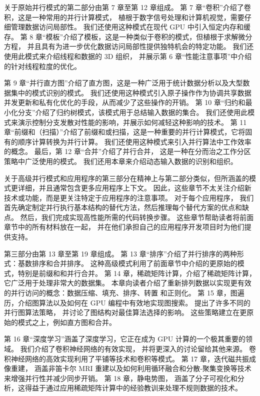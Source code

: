 关于原始并行模式的第二部分由第 7 章至第 12 章组成。 第 7 章“卷积”介绍了卷积，这是一种常用的并行计算模式，
植根于数字信号处理和计算机视觉，需要仔细管理数据访问局部性。 我们还使用这种模式在现代 GPU 中引入恒定内存和缓存。 
第 8 章“模板”介绍了模板，这是一种类似于卷积的模式，但植根于求解微分方程，
并且具有为进一步优化数据访问局部性提供独特机会的特定功能。 我们还使用此模式来介绍线程和数据的 3D 组织，
并展示第 6 章“性能注意事项”中介绍的针对线程粒度的优化。

第 9 章“并行直方图”介绍了直方图，这是一种广泛用于统计数据分析以及大型数据集中的模式识别的模式。 
我们还使用这种模式引入原子操作作为协调共享数据并发更新和私有化优化的手段，从而减少了这些操作的开销。 
第 10 章“归约和最小化分支”介绍了归约树模式，该模式用于总结输入数据的集合。 
我们还使用此模式来演示控制分支发散对性能的影响，并展示如何减轻这种影响的技术。 
第 11 章“前缀和（扫描）”介绍了前缀和或扫描，这是一种重要的并行计算模式，它将固有的顺序计算转换为并行计算。 
我们还使用这种模式来引入并行算法中工作效率的概念。 最后，第 12 章“合并”介绍了并行合并，
这是一种在分而治之工作分区策略中广泛使用的模式。 我们还用本章来介绍动态输入数据的识别和组织。

关于高级并行模式和应用程序的第三部分在精神上与第二部分类似，但所涵盖的模式更详细，并且通常包含更多应用程序上下文。 
因此，这些章节不太关注介绍新技术或功能，而是更关注特定于应用程序的注意事项。 对于每个应用程序，
我们首先确定制定并行执行基本结构的替代方法，然后推理每个替代方案的优点和缺点。 
然后，我们完成实现高性能所需的代码转换步骤。 这些章节帮助读者将前面章节中的所有材料放在一起，
并在他们承担自己的应用程序开发项目时为他们提供支持。

第三部分由第 13 章至第 19 章组成。 第 13 章“排序”介绍了并行排序的两种形式：基数排序和合并排序。 
这种高级模式利用了前面章节中介绍的更原始的模式，特别是前缀和和并行合并。 第 14 章，稀疏矩阵计算，介绍了稀疏矩阵计算，
它广泛用于处理非常大的数据集。 本章向读者介绍了重新排列数据以实现更有效的并行访问的概念：数据压缩、填充、排序、转置
和正则化。 第 15 章，图遍历，介绍图算法以及如何在 GPU 编程中有效地实现图搜索。 提出了许多不同的并行图算法策略，
并讨论了图结构对最佳算法选择的影响。 这些策略建立在更原始的模式之上，例如直方图和合并。

第 16 章“深度学习”涵盖了深度学习，它正在成为 GPU 计算的一个极其重要的领域。 我们介绍了卷积神经网络的有效实现，
并将更深入的讨论留给其他来源。 卷积神经网络的高效实现利用了平铺等技术和卷积等模式。 第 17 章，迭代磁共振成像重建，
涵盖非笛卡尔 MRI 重建以及如何利用循环融合和分散-聚集变换等技术来增强并行性并减少同步开销。 第 18 章，静电势图，
涵盖了分子可视化和分析，这得益于通过应用稀疏矩阵计算中的经验教训来处理不规则数据的技术。

